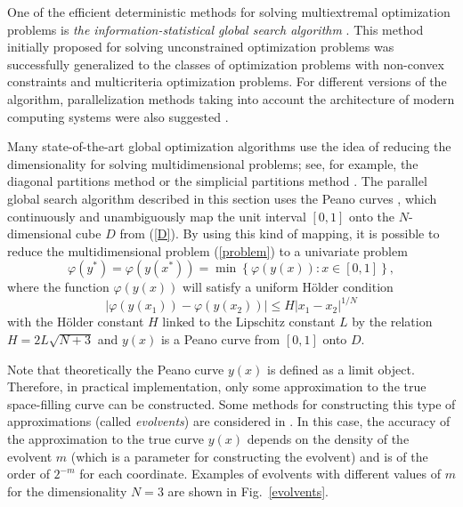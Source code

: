\documentclass{svproc}
\begin{document}
One of the efficient deterministic methods for solving multiextremal optimization problems is \textit{the information-statistical global search algorithm} \cite{Strongin2000}. This method initially proposed for solving unconstrained optimization problems was successfully generalized to the classes of optimization problems with non-convex constraints and multicriteria optimization problems. For different versions of the algorithm, parallelization methods taking into account the architecture of modern computing systems were also suggested \cite{Barkalov2016,globalizerSystem,Strongin2018}.%

Many state-of-the-art global optimization algorithms use the idea of reducing the dimensionality for solving multidimensional problems; see, for example, the diagonal partitions method \cite{Sergeyev2006} or the simplicial partitions method \cite{Zilinskas2008}. The parallel global search algorithm described in this section uses the Peano curves \cite{Sergeyev2013,Strongin2000}, which continuously and unambiguously map the unit interval $[0,1]$ onto the $N$-dimensional cube $D$ from (\ref{D}). By using this kind of mapping, it is possible to reduce the multidimensional problem (\ref{problem}) to a univariate problem
\[
\varphi(y^\ast)=\varphi(y(x^\ast))=\min{\left\{\varphi(y(x)): x\in[0,1]\right\}},
\]
where the function $\varphi(y(x))$ will satisfy a uniform H{\"o}lder condition
\[
\left|\varphi(y(x_1))-\varphi(y(x_2))\right|\leq H\left|x_1-x_2\right|^{1/N}
\]
with the H{\"o}lder constant $H$ linked to the Lipschitz constant $L$ by the relation
$ H=2 L \sqrt{N+3}$ and $y(x)$ is a Peano curve from $[0,1]$ onto $D$.

Note that theoretically the Peano curve $y(x)$ is defined as a limit object. Therefore, in practical implementation, only some approximation to the true space-filling curve can be constructed. Some methods for constructing this type of approximations (called \textit{evolvents}) are considered in \cite{Sergeyev2013,Strongin2000}. In this case, the accuracy of the approximation to the true curve $y(x)$ depends on the density of the evolvent $m$ (which is a parameter for constructing the evolvent) and is of the order of $2^{-m}$ for each coordinate.
Examples of evolvents with different values of $m$  for the dimensionality $N=3$ are shown in Fig.~\ref{evolvents}.
\end{document}
